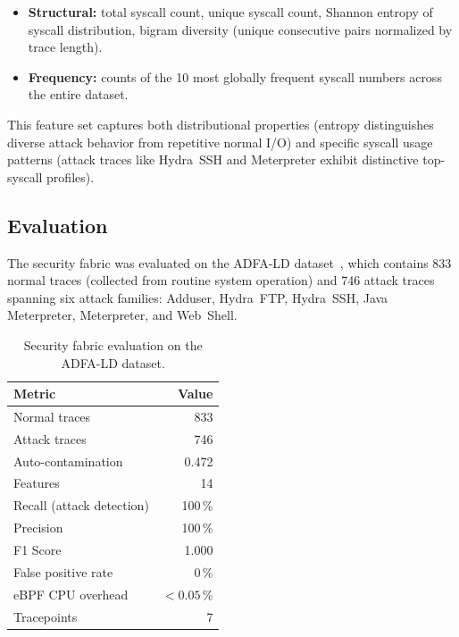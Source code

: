 \documentclass[11pt,letterpaper]{article}
\begin{document}
\begin{itemize}
\item \textbf{Structural:} total syscall count, unique syscall count,
  Shannon entropy of syscall distribution, bigram diversity (unique
  consecutive pairs normalized by trace length).
\item \textbf{Frequency:} counts of the 10 most globally frequent
  syscall numbers across the entire dataset.
\end{itemize}

This feature set captures both distributional properties (entropy
distinguishes diverse attack behavior from repetitive normal I/O) and
specific syscall usage patterns (attack traces like Hydra~SSH and
Meterpreter exhibit distinctive top-syscall profiles).

\subsection{Evaluation}

The security fabric was evaluated on the ADFA-LD
dataset~\cite{creech2013}, which contains 833 normal traces (collected
from routine system operation) and 746 attack traces spanning six attack
families: Adduser, Hydra~FTP, Hydra~SSH, Java Meterpreter, Meterpreter,
and Web~Shell.

\begin{table}[h]
\centering
\begin{tabular}{lr}
\toprule
\textbf{Metric} & \textbf{Value} \\
\midrule
Normal traces & 833 \\
Attack traces & 746 \\
Auto-contamination & 0.472 \\
Features & 14 \\
Recall (attack detection) & 100\,\% \\
Precision & 100\,\% \\
F1 Score & 1.000 \\
False positive rate & 0\,\% \\
eBPF CPU overhead & $< 0.05$\,\% \\
Tracepoints & 7 \\
\bottomrule
\end{tabular}
\caption{Security fabric evaluation on the ADFA-LD dataset.}
\end{table}
\end{document}
